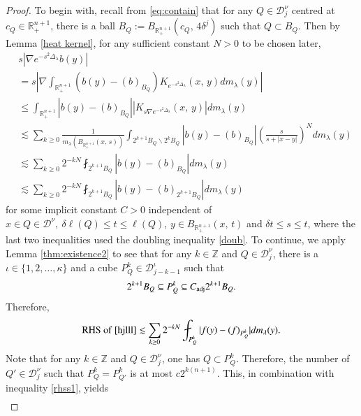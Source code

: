 \documentclass[12pt]{amsart}
\begin{document}
\begin{proof}
To begin with, recall from \eqref{eq:contain} that for any $Q\in\mathcal{D}_j^\nu$ centred at $c_Q\in\mathbb{R}_+^{n+1}$, there is a ball $B_Q:=B_{\mathbb{R}_{+}^{n+1}}(c_Q,\,4\delta^j)$ such that $Q\subset B_Q$. Then by Lemma \ref{heat kernel}, for any sufficient constant $N>0$ to be chosen later,
\begin{align}\label{hjlll}
&s\left|\nabla e^{-s^2{\Delta_\lambda}}b(y)\right|\nonumber\\
&=s\left|\nabla\int_{\mathbb{R}_+^{n+1}}(b(y)-(b)_{B_Q})K_{e^{-s^2{\Delta_\lambda}}}(x,\,y)dm_\lambda(y)\right|\nonumber\\
&\leq\int_{\mathbb{R}_+^{n+1}}|b(y)-(b)_{B_Q}||K_{s\nabla e^{-s^2{\Delta_\lambda}}}(x,\,y)|dm_\lambda(y)\nonumber\\
&\lesssim\sum_{k\geq 0}\frac{1}{m_\lambda(B_{\mathbb{R}_+^{n+1}}(x,\,s))}\int_{2^{k+1}B_Q\backslash 2^kB_Q}|b(y)-(b)_{B_Q}| \left(\frac{s}{s+|x-y|}\right)^N dm_\lambda(y)\nonumber\\
&\lesssim \sum_{k\geq 0}2^{-kN}\fint_{2^{k+1}B_Q}|b(y)-(b)_{B_Q}|dm_\lambda(y)\nonumber\\
&\lesssim \sum_{k\geq 0}2^{-kN}\fint_{2^{k+1}B_Q}|b(y)-(b)_{2^{k+1}B_Q}|dm_\lambda(y)
\end{align}
for some implicit constant $C>0$ independent of $x\in Q\in\mathcal{D}^\nu,\ \delta\ell(Q)\leq t\leq \ell(Q)$, $y\in B_{\mathbb{R}_+^{n+1}}(x,\,t)$ and $\delta t\leq s\leq t$,
where the last two inequalities used the doubling inequality \eqref{doub}. To continue, we apply Lemma \ref{thm:existence2} to see that for any $k\in\mathbb{Z}$ and $Q\in\mathcal{D}_j^\nu$, there is a $\iota\in\{1,2,\ldots ,\kappa\}$ and a cube $P_Q^k\in \mathcal{D}_{j-k-1}^\iota$ such that
\begin{equation}
    2^{k+1}B_Q\subseteq P_Q^k\subseteq C_{{\rm adj}}2^{k+1}B_Q.
\end{equation}
Therefore,
\begin{align}\label{rhss1}
{\rm RHS}\ {\rm of}\ \eqref{hjlll}\lesssim\sum_{k\geq 0}2^{-kN}\fint_{P_Q^k}|f(y)-(f)_{P_Q^k}|dm_\lambda(y).
\end{align}
Note that for any $k\in\mathbb{Z}$ and $Q\in\mathcal{D}^\nu_j$, one has $Q\subset P_Q^k$. Therefore, the number of $Q'\in\mathcal{D}^\nu_j$ such that $P_Q^k=P_{Q'}^k$ is at most $c2^{k(n+1)}$. This, in combination with inequality \eqref{rhss1}, yields
\begin{align*}

\end{align*}
\end{proof}
\end{document}
